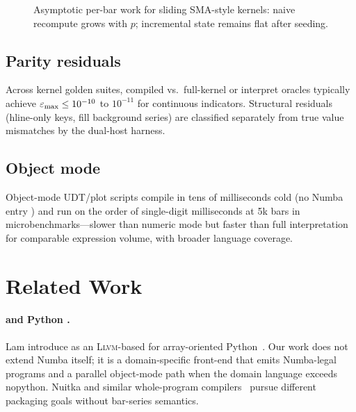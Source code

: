 \documentclass[11pt,a4paper]{article}
\newcommand{\llvm}{\textsc{Llvm}}
\begin{document}
\begin{figure}[t]
\centering
{}
\caption{Asymptotic per-bar work for sliding SMA-style kernels: naive
recompute grows with $p$; incremental state remains flat after seeding.}
\label{fig:speedup}
\end{figure}

\subsection{Parity residuals}

Across kernel golden suites, compiled vs.\ full-kernel or interpret oracles
typically achieve $\varepsilon_{\mathrm{max}} \le 10^{-10}$ to $10^{-11}$ for continuous
indicators. Structural residuals (hline-only keys, fill background series)
are classified separately from true value mismatches by the dual-host
harness.

\subsection{Object mode}

Object-mode UDT/plot scripts compile in tens of milliseconds cold (no Numba
entry \jit{}) and run on the order of single-digit milliseconds at 5k bars
in microbenchmarks---slower than numeric mode but faster than full \ast{}
interpretation for comparable expression volume, with broader language
coverage.

\section{Related Work}
\label{sec:related}

\paragraph{\numba{} and Python \jit{}.}
Lam \etal{} introduce \numba{} as an \llvm{}-based \jit{} for array-oriented
Python~\citep{lam2015numba}. Our work does not extend Numba itself; it is a
domain-specific front-end that emits Numba-legal programs and a parallel
object-mode path when the domain language exceeds nopython. Nuitka and
similar whole-program compilers~\citep{nuitka} pursue different packaging
goals without bar-series semantics.
\end{document}
